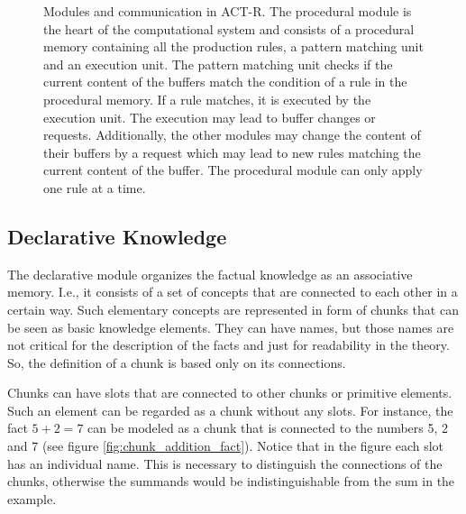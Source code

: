 \begin{figure}[hbt]
\caption{Modules and communication in ACT-R. The procedural module is the heart of the computational system and consists of a procedural memory containing all the production rules, a pattern matching unit and an execution unit. The pattern matching unit checks if the current content of the buffers match the condition of a rule in the procedural memory. If a rule matches, it is executed by the execution unit. The execution may lead to buffer changes or requests. Additionally, the other modules may change the content of their buffers by a request which may lead to new rules matching the current content of the buffer. The procedural module can only apply one rule at a time. \cite{about_actr_homepage}}
\label{fig:recognize_act}
\end{figure}

\subsection{Declarative Knowledge}

The declarative module organizes the factual knowledge as an associative memory. I.e., it consists of a set of concepts that are connected to each other in a certain way. Such elementary concepts are represented in form of chunks that can be seen as basic knowledge elements. They can have names, but those names are not critical for the description of the facts and just for readability in the theory. So, the definition of a chunk is based only on its connections. 

Chunks can have slots that are connected to other chunks or primitive elements. Such an element can be regarded as a chunk without any slots. For instance, the fact $5 + 2 = 7$ can be modeled as a chunk that is connected to the numbers 5, 2 and 7 (see figure \ref{fig:chunk_addition_fact}). Notice that in the figure each slot has an individual name. This is necessary to distinguish the connections of the chunks, otherwise the summands would be indistinguishable from the sum in the example.

